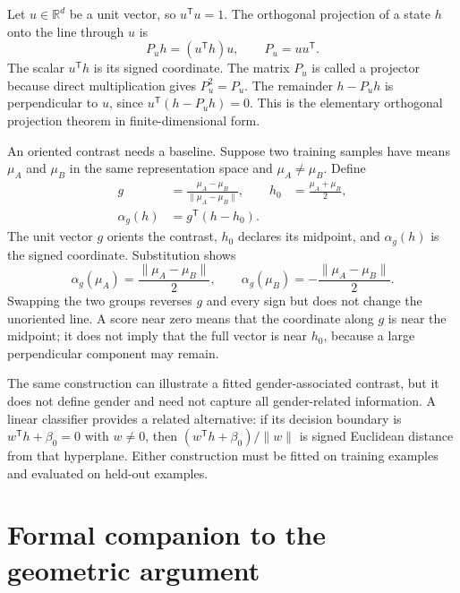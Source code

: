 \documentclass[
  aps,
  reprint,
  superscriptaddress,
  floatfix,
  nofootinbib,
  longbibliography
]{revtex4-2}
\newcommand{\R}{\mathbb{R}}
\newcommand{\T}{^{\mathsf T}}
\newcommand{\norm}[1]{\lVert #1\rVert}
\begin{document}
Let $u\in\R^d$ be a unit vector, so $u\T u=1$.  The orthogonal projection of a
state $h$ onto the line through $u$ is
\begin{equation}
 P_u h=(u\T h)u,
 \qquad P_u=uu\T .
 \label{eq:projection-app}
\end{equation}
The scalar $u\T h$ is its signed coordinate.  The matrix $P_u$ is called a
projector because direct multiplication gives $P_u^2=P_u$.  The remainder
$h-P_u h$ is perpendicular to $u$, since
$u\T(h-P_u h)=0$.  This is the elementary orthogonal projection theorem in
finite-dimensional form.

An oriented contrast needs a baseline.  Suppose two training samples have
means $\mu_A$ and $\mu_B$ in the same representation space and
$\mu_A\ne\mu_B$.  Define
\begin{equation}
\begin{aligned}
 g&=\frac{\mu_A-\mu_B}{\norm{\mu_A-\mu_B}},
 &h_0&=\frac{\mu_A+\mu_B}{2},\\
 \alpha_g(h)&=g\T(h-h_0).
\end{aligned}
 \label{eq:signed-axis-app}
\end{equation}
The unit vector $g$ orients the contrast, $h_0$ declares its midpoint, and
$\alpha_g(h)$ is the signed coordinate.  Substitution shows
\begin{equation}
 \alpha_g(\mu_A)=\frac{\norm{\mu_A-\mu_B}}{2},
 \qquad
 \alpha_g(\mu_B)=-\frac{\norm{\mu_A-\mu_B}}{2}.
 \label{eq:mean-scores-app}
\end{equation}
Swapping the two groups reverses $g$ and every sign but does not change the
unoriented line.  A score near zero means that the coordinate along $g$ is near
the midpoint; it does not imply that the full vector is near $h_0$, because a
large perpendicular component may remain.

The same construction can illustrate a fitted gender-associated contrast,
but it does not define gender and need not capture all gender-related
information.  A linear classifier provides a related alternative: if its
decision boundary is $w\T h+\beta_0=0$ with $w\ne0$, then
$(w\T h+\beta_0)/\norm w$ is signed Euclidean distance from that hyperplane.
Either construction must be fitted on training examples and evaluated on
held-out examples.

\section{Formal companion to the geometric argument}
\label{app:geometry}
\end{document}
